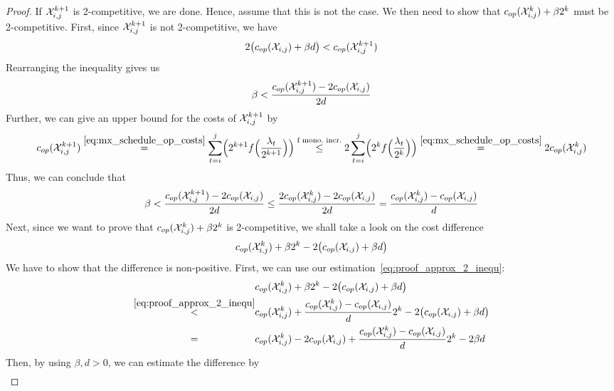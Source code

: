 \begin{proof}
If $\mathcal{X}_{i,j}^{k+1}$ is 2-competitive, we are done. Hence, assume that this is not the case. We then need to show that $c_{op}(\mathcal{X}_{i,j}^k)+\beta2^k$ must be 2-competitive. First, since $\mathcal{X}_{i,j}^{k+1}$ is not 2-competitive, we have
\begin{equation*}
	2\bigl(c_{op}(\mathcal{X}_{i,j})+\beta d\bigr)<c_{op}(\mathcal{X}_{i,j}^{k+1})
\end{equation*}
Rearranging the inequality gives us	
\begin{equation*}
	\beta<\frac{c_{op}(\mathcal{X}_{i,j}^{k+1})-2c_{op}(\mathcal{X}_{i,j})}{2d}
\end{equation*}
Further, we can give an upper bound for the costs of $\mathcal{X}_{i,j}^{k+1}$ by
\begin{equation*}
	\opcosts(\mx_{i,j}^{k+1})\stackrel{\eqref{eq:mx_schedule_op_costs}}{=}\sum_{t=i}^j\Bigl(2^{k+1}f\Bigl(\frac{\lambda_t}{2^{k+1}}\Bigr)\Bigr)\stackrel{\text{f mono.\ incr.}}{\le}2\sum_{t=i}^j\Bigl(2^kf\Bigl(\frac{\lambda_t}{2^k}\Bigr)\Bigr)\stackrel{\eqref{eq:mx_schedule_op_costs}}{=}2\opcosts(\mx_{i,j}^k)
\end{equation*}
Thus, we can conclude that
\begin{equation}\label{eq:proof_approx_2_inequ}
	\beta<\frac{c_{op}(\mathcal{X}_{i,j}^{k+1})-2c_{op}(\mathcal{X}_{i,j})}{2d}\le\frac{2c_{op}(\mathcal{X}_{i,j}^k)-2c_{op}(\mathcal{X}_{i,j})}{2d}=\frac{c_{op}(\mathcal{X}_{i,j}^k)-c_{op}(\mathcal{X}_{i,j})}{d}
\end{equation}
Next, since we want to prove that $c_{op}(\mathcal{X}_{i,j}^k)+\beta2^k$ is 2-competitive, we shall take a look on the cost difference 
\begin{align*}
	c_{op}(\mathcal{X}_{i,j}^k)+\beta2^k-2\bigl(c_{op}(\mathcal{X}_{i,j})+\beta d\bigr)
\end{align*}
We have to show that the difference is non-positive. First, we can use our estimation~\eqref{eq:proof_approx_2_inequ}:
\begin{align*}
	&\opcosts(\mx_{i,j}^k)+\beta2^k-2\bigl(\opcosts(\mx_{i,j})+\beta d\bigr)\\
	\stackrel{\eqref{eq:proof_approx_2_inequ}}{<}&\opcosts(\mx_{i,j}^k)+\frac{\opcosts(\mx_{i,j}^k)-\opcosts(\mx_{i,j})}{d}2^k-2\bigl(\opcosts(\mx_{i,j})+\beta d\bigr)\\
	\stackrel{\phantom{\eqref{eq:proof_approx_2_inequ}}}{=}&\opcosts(\mx_{i,j}^k)-2\opcosts(\mx_{i,j})+\frac{\opcosts(\mx_{i,j}^k)-\opcosts(\mx_{i,j})}{d}2^k-2\beta d
\end{align*}
Then, by using $\beta,d>0$, we can estimate the difference by
\begin{align*}

\end{align*}
\end{proof}
